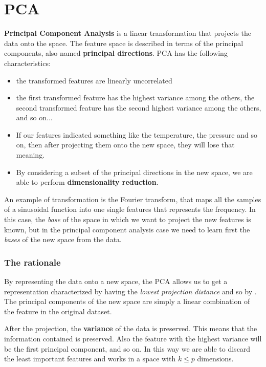 \section{PCA}
\textbf{Principal Component Analysis} is a linear transformation that projects the data onto the space.
The feature space is described in terms of the principal components, also named \textbf{principal directions}. PCA has the following characteristics:
\begin{itemize}
    \item the transformed features are linearly uncorrelated
    \item the first transformed feature has the highest variance among the others, the second transformed feature has the second highest variance among the others, and so on...
    \item If our features indicated something like the temperature, the pressure and so on, then after projecting them onto the new space, they will lose that meaning.
    \item By considering a subset of the principal directions in the new space, we are able to perform \textbf{dimensionality reduction}.
\end{itemize}

An example of transformation is the Fourier transform, that maps all the samples of a sinusoidal function into one single features that represents the frequency. In this case, the \textit{base} of the space in which we want to project the new features is known, but in the principal component analysis case we need to learn first the \textit{bases} of the new space from the data.

\subsubsection*{The rationale}
By representing the data onto a new space, the PCA allows us to get a representation characterized by having the \textit{lowest projection distance} and so by . 
The principal components of the new space are simply a linear combination of the feature in the original dataset.

After the projection, the \textbf{variance} of the data is preserved. This means that the information contained is preserved. Also the feature with the highest variance will be the first principal component, and so on. In this way we are able to discard the least important features and works in a space with $k\le p$ dimensions.

